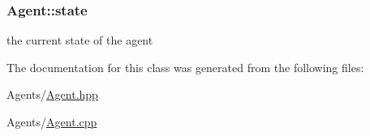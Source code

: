 \subsubsection[{\texorpdfstring{state}{state}}]{ Agent\+::state\hspace{0.3cm}{\ttfamily [protected]}}\hypertarget{classAgent_a6ef1b669e841f34e42619a2429160dc7}{}\label{classAgent_a6ef1b669e841f34e42619a2429160dc7}
the current state of the agent 

The documentation for this class was generated from the following files\+:\begin{DoxyCompactItemize}
\item 
Agents/\hyperlink{Agent_8hpp}{Agent.\+hpp}\item 
Agents/\hyperlink{Agent_8cpp}{Agent.\+cpp}\end{DoxyCompactItemize}
